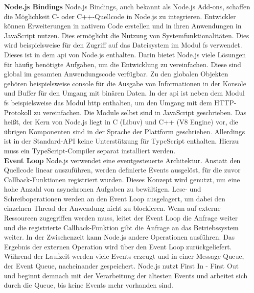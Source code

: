 \noindent
\textbf{Node.js Bindings} \newline
Node.js Bindings, auch bekannt als Node.js Add-ons, schaffen die Möglichkeit C- oder C++-Quellcode in Node.js zu integrieren. Entwickler können Erweiterungen in nativem Code erstellen und in ihren Anwendungen in JavaScript nutzen. Dies ermöglicht die Nutzung von Systemfunktionalitäten. Dies wird beispielsweise für den Zugriff auf das Dateisystem im Modul \glq fs\grq{} verwendet. Dieses ist in dem \ac{api} von Node.js enthalten. Darin bietet Node.js viele Lösungen für häufig benötigte Aufgaben, um die Entwicklung zu vereinfachen. Diese sind global im gesamten Anwendungscode verfügbar. Zu den globalen Objekten gehören beispielsweise \glq console\grq{} für die Ausgabe von Informationen in der Konsole und \glq Buffer\grq{} für den Umgang mit binären Daten. In der \ac{api} ist neben dem Modul \glq fs\grq{} beispielsweise das Modul \glq http\grq{} enthalten, um den Umgang mit dem HTTP-Protokoll zu vereinfachen. Die Module selbst sind in JavaScript geschrieben. Das heißt, der Kern von Node.js liegt in C (Libuv) und C++ (V8 Engine)  vor, die übrigen Komponenten sind in der Sprache der Plattform geschrieben. Allerdings ist in der Standard-API keine Unterstützung für TypeScript enthalten. Hierzu muss ein TypeScript-Compiler separat installiert werden.\cite{Springer.2022, OpenJSFoundation.2022b, OpenJSFoundation.o.J.b}\\

\noindent
\textbf{Event Loop} \newline
Node.js verwendet eine eventgesteuerte Architektur. Anstatt den Quellcode linear auszuführen, werden definierte Events ausgelöst, für die zuvor Callback-Funktionen registriert wurden. Dieses Konzept wird genutzt, um eine hohe Anzahl von asynchronen Aufgaben zu bewältigen. Lese- und Schreiboperationen werden an den Event Loop ausgelagert, um dabei den einzelnen Thread der Anwendung nicht zu blockieren. Wenn auf externe Ressourcen zugegriffen werden muss, leitet der Event Loop die Anfrage weiter und die registrierte Callback-Funktion gibt die Anfrage an das Betriebssystem weiter. In der Zwischenzeit kann Node.js andere Operationen ausführen. Das Ergebnis der externen Operation wird über den Event Loop zurückgeliefert.\cite{Springer.2022} \newline 
Während der Laufzeit werden viele Events erzeugt und in einer Message Queue, der Event Queue, nacheinander gespeichert. Node.js nutzt \glqq First In - First Out\grqq{} und beginnt demnach mit der Verarbeitung der ältesten Events und arbeitet sich durch die Queue, bis keine Events mehr vorhanden sind.\cite{OpenJSFoundation.o.J.c}\\

